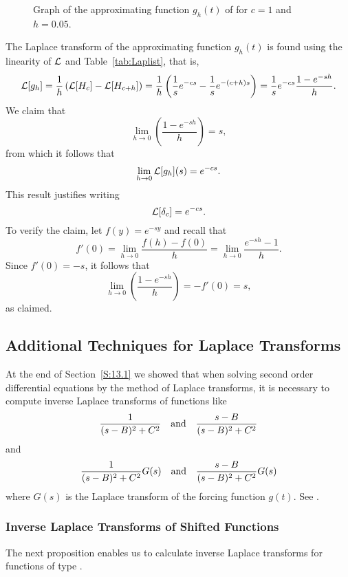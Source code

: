 \documentclass{ximera}
\begin{document}
\begin{figure}[htb]
           \centerline{%
           }
           \caption{Graph of the approximating function $g_h(t)$ of  
	   \protect{} for $c=1$ and $h=0.05$.}
           \label{fig:deltah}
\end{figure}

The Laplace transform of the approximating function $g_h(t)$ is found using 
the linearity of ${\cal L}$ and Table~\ref{tab:Laplist}, that is,
\[
{\cal L}[g_h] =  \frac{1}{h} \left({\cal L}[H_c]-{\cal L}[H_{c+h}]\right) =
\frac{1}{h}\left(\frac{1}{s}e^{-cs}-
\frac{1}{s}e^{-(c+h)s}\right) = \frac{1}{s}e^{-cs}\frac{1-e^{-sh}}{h}.
\]
We claim that
\[
\lim_{h\to 0} \left(\frac{1-e^{-sh}}{h}\right)=s,
\]
from which it follows that 
\[
\lim_{h\to 0} {\cal L}[g_h](s)=e^{-cs}.
\]
This result justifies writing
\begin{equation}  \label{e:lapdel}
{\cal L}[\delta_c] = e^{-cs}.
\end{equation}
To verify the claim, let $f(y)=e^{-sy}$ and recall that 
\[
f'(0) = \lim_{h\to 0} \frac{f(h)-f(0)}{h} =\lim_{h\to 0} \frac{e^{-sh}-1}{h}.
\]
Since $f'(0)=-s$, it follows that
\[
\lim_{h\to 0} \left(\frac{1-e^{-sh}}{h}\right)=-f'(0)=s,
\]
as claimed.


\subsection*{Additional Techniques for Laplace Transforms}

At the end of Section~\ref{S:13.1} we showed that when solving second order
differential equations by the method of Laplace transforms, it is necessary to 
compute inverse Laplace transforms of functions like
\begin{equation}  \label{E:1sttype}
\frac{1}{(s-B)^2+C^2} \quad\mbox{and}\quad \frac{s-B}{(s-B)^2+C^2}
\end{equation}
and 
\begin{equation}  \label{2ndtype}
\frac{1}{(s-B)^2+C^2}G(s) \quad\mbox{and}\quad \frac{s-B}{(s-B)^2+C^2}G(s)
\end{equation}
where $G(s)$ is the Laplace transform of the forcing function $g(t)$.
See .  

\subsubsection*{Inverse Laplace Transforms of Shifted Functions}

The next proposition enables us to calculate inverse Laplace transforms for
functions of type .
\end{document}
